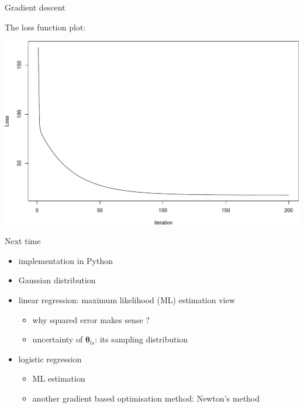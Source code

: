 \documentclass[ignorenonframetext,]{beamer}
\providecommand{\tightlist}{%
  \setlength{\itemsep}{0pt}\setlength{\parskip}{0pt}}
\newcommand{\vv}[1]{\boldsymbol{#1}}
\begin{document}
\begin{frame}{Gradient descent}
\protect\hypertarget{gradient-descent-1}{}

The loss function plot:

\bigskip

\begin{center}\includegraphics[width=0.6\linewidth]{lecture3_files/figure-beamer/unnamed-chunk-11-1} \end{center}

\end{frame}

\begin{frame}{Next time}
\protect\hypertarget{next-time}{}

\begin{itemize}
\item
  implementation in Python
\item
  Gaussian distribution
\item
  linear regression: maximum likelihood (ML) estimation view

  \begin{itemize}
  \tightlist
  \item
    why squared error makes sense ?
  \item
    uncertainty of \(\vv{\theta}_{ls}\): its sampling distribution
  \end{itemize}
\item
  logistic regression

  \begin{itemize}
  \tightlist
  \item
    ML estimation
  \item
    another gradient based optimisation method: Newton's method
  \end{itemize}
\end{itemize}

\end{frame}
\end{document}
